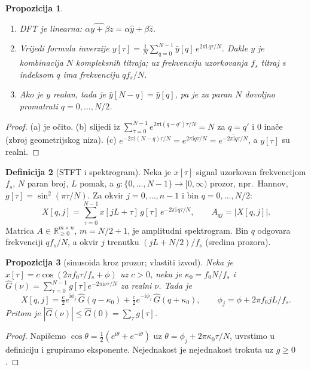 \documentclass[11pt,a4paper]{article}
\theoremstyle{definition}
\newtheorem{definicija}{Definicija}[section]
\theoremstyle{plain}
\newtheorem{propozicija}[definicija]{Propozicija}
\theoremstyle{remark}
\newcommand{\Rp}{\mathbb{R}_{\geq 0}}
\newcommand{\iu}{\mathrm{i}}
\begin{document}
\begin{propozicija}\label{prop:dft}
\begin{enumerate}[label=(\alph*)]
\item DFT je linearna: $\widehat{\alpha y+\beta z}=\alpha\hat y+\beta\hat z$.
\item Vrijedi formula inverzije $y[\tau]=\frac1N\sum_{q=0}^{N-1}\hat y[q]\,e^{2\pi\iu\,q\tau/N}$. Dakle
  $y$ je kombinacija $N$ kompleksnih titraja; uz frekvenciju uzorkovanja $f_s$ titraj s indeksom
  $q$ ima frekvenciju $qf_s/N$.
\item Ako je $y$ realan, tada je $\hat y[N-q]=\overline{\hat y[q]}$, pa je za paran $N$ dovoljno
  promatrati $q=0,\dots,N/2$.
\end{enumerate}
\end{propozicija}
\begin{proof}
(a) je očito. (b) slijedi iz $\sum_{\tau=0}^{N-1}e^{2\pi\iu(q-q')\tau/N}=N$ za $q=q'$ i $0$ inače
(zbroj geometrijskog niza). (c) $e^{-2\pi\iu(N-q)\tau/N}=e^{2\pi\iu q\tau/N}=\overline{e^{-2\pi\iu
q\tau/N}}$, a $y[\tau]$ su realni.
\end{proof}

\begin{definicija}[STFT i spektrogram]\label{def:spektrogram}
Neka je $x[\tau]$ signal uzorkovan frekvencijom $f_s$, $N$ paran broj, $L$ pomak, a
$g\colon\{0,\dots,N-1\}\to[0,\infty)$ prozor, npr.\ Hannov, $g[\tau]=\sin^2(\pi\tau/N)$. Za okvir $j=0,\dots,n-1$ i
bin $q=0,\dots,N/2$:
\[
  X[q,j]=\sum_{\tau=0}^{N-1}x[jL+\tau]\,g[\tau]\,e^{-2\pi\iu\,q\tau/N},\qquad A_{qj}=|X[q,j]|.
\]
Matrica $A\in\Rp^{m\times n}$, $m=N/2+1$, je amplitudni spektrogram. Bin $q$ odgovara frekvenciji
$qf_s/N$, a okvir $j$ trenutku $(jL+N/2)/f_s$ (sredina prozora).
\end{definicija}

\begin{propozicija}[sinusoida kroz prozor; vlastiti izvod]\label{prop:sinusoida}
Neka je $x[\tau]=c\cos(2\pi f_0\tau/f_s+\phi)$ uz $c>0$, neka je $\kappa_0=f_0N/f_s$ i
$\hat G(\nu)=\sum_{\tau=0}^{N-1}g[\tau]e^{-2\pi\iu\nu\tau/N}$ za realni $\nu$. Tada je
\[
  X[q,j]=\tfrac c2 e^{\iu\phi_j}\,\hat G(q-\kappa_0)+\tfrac c2 e^{-\iu\phi_j}\,\hat G(q+\kappa_0),
  \qquad \phi_j=\phi+2\pi f_0jL/f_s .
\]
Pritom je $|\hat G(\nu)|\leq\hat G(0)=\sum_\tau g[\tau]$.
\end{propozicija}
\begin{proof}
Napišemo $\cos\theta=\frac12(e^{\iu\theta}+e^{-\iu\theta})$ uz
$\theta=\phi_j+2\pi\kappa_0\tau/N$, uvrstimo u definiciju i grupiramo eksponente. Nejednakost je
nejednakost trokuta uz $g\geq0$.
\end{proof}
\end{document}
